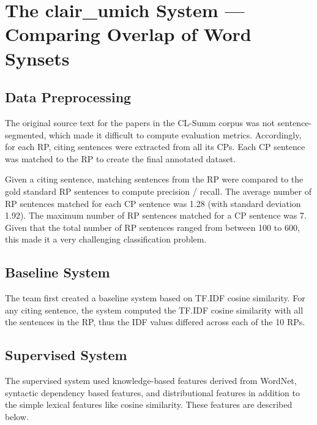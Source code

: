 \documentclass[11pt]{article}
\begin{document}
\section{The clair\_umich System --- Comparing Overlap of Word Synsets}
\label{s:umich}
\subsection{Data Preprocessing}

The original source text for the papers in the CL-Summ corpus was not sentence-segmented, which made it difficult to compute evaluation metrics. Accordingly, for each RP, citing sentences were extracted from all its CPs. Each CP sentence was matched to the RP to create the final annotated dataset. 

Given a citing sentence, matching sentences from the RP were compared to the gold standard RP sentences to compute precision / recall. The average number of RP sentences matched for each CP sentence was 1.28 (with standard deviation 1.92). The maximum number of RP sentences matched for a CP sentence was 7. Given that the total number of RP sentences ranged from between 100 to 600, this made it a very challenging classification problem. 

\subsection{Baseline System}


The team first created a baseline system based on TF.IDF cosine similarity. For any citing sentence, the system computed the TF.IDF
cosine similarity with all the sentences in the RP, thus the IDF values differed across each of the 10 RPs.

\subsection{Supervised System}
The supervised system used knowledge-based features derived from WordNet, syntactic dependency based features, and distributional features in addition to the simple lexical features like cosine similarity. These features are described below.
\end{document}
